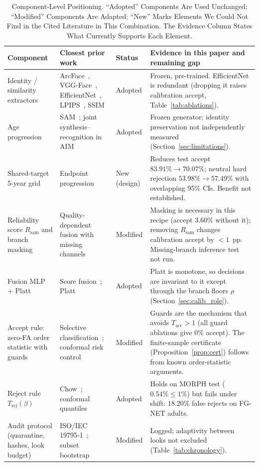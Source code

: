 \begin{table}[t]
\centering
\caption{Component-Level Positioning. ``Adopted'' Components Are Used Unchanged; ``Modified'' Components Are Adapted; ``New'' Marks Elements We Could Not Find in the Cited Literature in This Combination. The Evidence Column States What Currently Supports Each Element.}
\label{tab:positioning}
\footnotesize
\setlength{\tabcolsep}{3pt}
\begin{tabular}{@{}p{3.1cm}p{4.0cm}p{1.3cm}p{8.4cm}@{}}
\toprule
\textbf{Component} & \textbf{Closest prior work} & \textbf{Status} & \textbf{Evidence in this paper and remaining gap} \\
\midrule
Identity / similarity extractors & ArcFace~\cite{deng2019arcface}, VGG-Face~\cite{parkhi2015vgg}, EfficientNet~\cite{tan2019efficientnet}, LPIPS~\cite{zhang2018lpips}, SSIM~\cite{wang2004ssim} & Adopted & Frozen, pre-trained. EfficientNet is redundant (dropping it raises calibration accept, Table~\ref{tab:ablations}). \\
Age progression & SAM~\cite{alaluf2021sam}; joint synthesis--recognition in AIM~\cite{zhao2022aim} & Adopted & Frozen generator; identity preservation not independently measured (Section~\ref{sec:limitations}). \\
Shared-target 5-year grid & Endpoint progression~\cite{zhao2022aim,huang2021pfagan} & New (design) & Reduces test accept $83.91\%\to70.07\%$; neutral hard rejection $53.98\%\to57.49\%$ with overlapping 95\% CIs. Benefit not established. \\
Reliability score $R_{\text{sam}}$ and branch masking & Quality-dependent fusion with missing channels~\cite{poh2009quality} & Modified & Masking is necessary in this recipe (accept $3.60\%$ without it); removing $R_{\text{sam}}$ changes calibration accept by $<1$~pp. Missing-branch inference test not run. \\
Fusion MLP + Platt & Score fusion~\cite{kittler1998combining,ross2003fusion,nandakumar2008lr}; Platt~\cite{platt1999} & Adopted & Platt is monotone, so decisions are invariant to it except through the branch floors $\rho$ (Section~\ref{sec:calib_role}). \\
Accept rule: zero-FA order statistic with guards & Selective classification~\cite{geifman2017selective,elyaniv2010selective}; conformal risk control~\cite{vovk2005alrw,angelopoulos2024crc} & Modified & Guards are the mechanism that avoids $T_{\text{acc}}>1$ (all guard ablations give 0\% accept). The finite-sample certificate (Proposition~\ref{prop:cert}) follows from known order-statistic arguments. \\
Reject rule $T_{\text{rej}}(\beta)$ & Chow~\cite{chow1970reject}; conformal quantiles~\cite{vovk2005alrw} & Adopted & Holds on MORPH test ($0.54\%\le1\%$) but fails under shift: $18.20\%$ false rejects on FG-NET adults. \\
Audit protocol (quarantine, hashes, look budget) & ISO/IEC 19795-1~\cite{iso19795_1}; subset bootstrap~\cite{bolle2004subsets} & Modified & Logged; adaptivity between looks not excluded (Table~\ref{tab:chronology}). \\
\bottomrule
\end{tabular}
\end{table}
